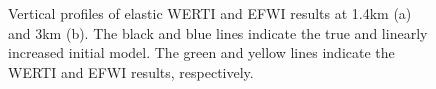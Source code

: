 \begin{figure}[!htb]
   \caption{Vertical profiles of elastic WERTI and EFWI results at 1.4km (a) and
       3km (b). The black and blue lines indicate the true and linearly increased
       initial model. The green and yellow lines indicate the WERTI and EFWI results,
       respectively.
   }
   \label{fig:Profiles}
\end{figure}
